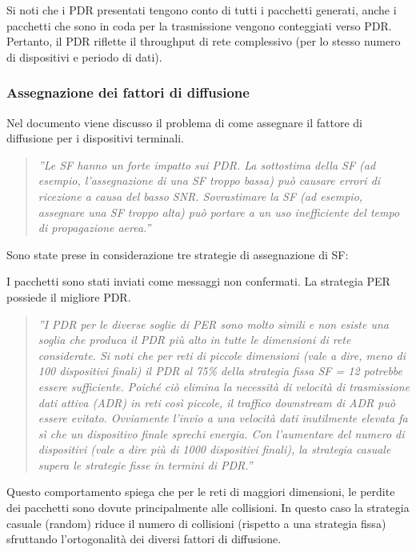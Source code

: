 \documentclass[a4paper]{report} %
\begin{document}
Si noti che i PDR presentati tengono conto di tutti i pacchetti generati, anche i pacchetti che sono in coda per la trasmissione vengono conteggiati verso PDR. Pertanto, il PDR riflette il throughput di rete complessivo (per lo stesso numero di dispositivi e periodo di dati).

\subsubsection{Assegnazione dei fattori di diffusione}
Nel documento \cite{art:rif.49} viene discusso il problema di come assegnare il fattore di diffusione per i dispositivi terminali. 
\begin{quote}
	\textit{''Le SF hanno un forte impatto sui PDR. La sottostima della SF (ad esempio, l'assegnazione di una SF troppo bassa) può causare errori di ricezione a causa del basso SNR. Sovrastimare la SF (ad esempio, assegnare una SF troppo alta) può portare a un uso inefficiente del tempo di propagazione aerea.''}
\end{quote}
Sono state prese in considerazione tre strategie di assegnazione di SF:
\begin{quote}
\end{quote}
I pacchetti sono stati inviati come messaggi non confermati. La strategia PER possiede il migliore PDR. 
\begin{quote}
	\textit{''I PDR per le diverse soglie di PER sono molto simili e non esiste una soglia che produca il PDR più alto in tutte le dimensioni di rete considerate. Si noti che per reti di piccole dimensioni (vale a dire, meno di 100 dispositivi finali) il PDR al 75\% della strategia fissa SF = 12 potrebbe essere sufficiente. Poiché ciò elimina la necessità di velocità di trasmissione dati attiva (ADR) in reti così piccole, il traffico downstream di ADR può essere evitato. Ovviamente l'invio a una velocità dati inutilmente elevata fa sì che un dispositivo finale sprechi energia. Con l'aumentare del numero di dispositivi (vale a dire più di 1000 dispositivi finali), la strategia casuale supera le strategie fisse in termini di PDR.''}
\end{quote}
Questo comportamento spiega che per le reti di maggiori dimensioni, le perdite dei pacchetti sono dovute principalmente alle collisioni. In questo caso la strategia casuale (random) riduce il numero di collisioni (rispetto a una strategia fissa) sfruttando l'ortogonalità dei diversi fattori di diffusione.
\end{document}
